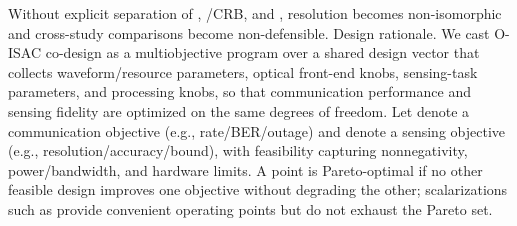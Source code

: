 {}\markdownRendererParagraphSeparator
{} Without explicit separation of , /CRB, and , resolution becomes non-isomorphic and cross-study comparisons become non-defensible.\markdownRendererInterblockSeparator
{}\markdownRendererThematicBreak{}\markdownRendererInterblockSeparator
{}
\markdownRendererSectionEnd 
\markdownRendererSectionEnd \markdownRendererSectionBegin
{}\markdownRendererInterblockSeparator
{}\markdownRendererSectionBegin
{}\markdownRendererInterblockSeparator
{}Design rationale. We cast O-ISAC co-design as a multiobjective program over a shared design vector  that collects waveform/resource parameters, optical front-end knobs, sensing-task parameters, and processing knobs, so that communication performance and sensing fidelity are optimized on the same degrees of freedom. Let  denote a communication objective (e.g., rate/BER/outage) and  denote a sensing objective (e.g., resolution/accuracy/bound), with feasibility  capturing nonnegativity, power/bandwidth, and hardware limits. A point  is Pareto-optimal if no other feasible design improves one objective without degrading the other; scalarizations such as  provide convenient operating points but do not exhaust the Pareto set.\markdownRendererParagraphSeparator
